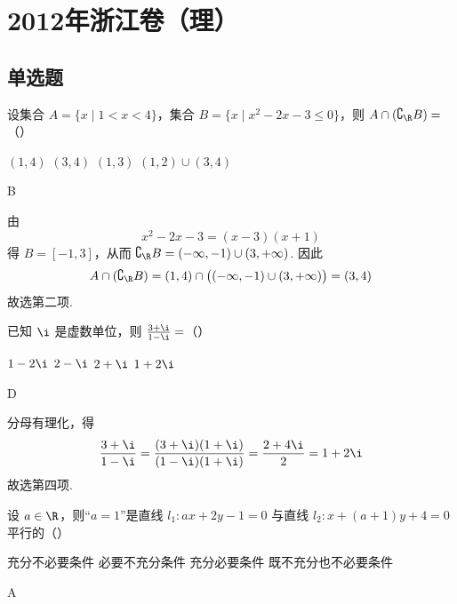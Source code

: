 \chapter{2012年浙江卷（理）}

\section{单选题}

\begin{problem}
设集合 \(A = \{x \mid 1 < x < 4\}\)，集合 \(B = \{x \mid x^2 - 2x - 3 \leqslant 0\}\)，则 \(A \cap (\complement_{\R} B) =\)（\quad）

\choices
    {\((1, 4)\)}
    {\((3, 4)\)}
    {\((1, 3)\)}
    {\((1,2)\cup(3,4)\)}
\end{problem}

\begin{answer}
B
\end{answer}

\begin{solution}
由
\[
x^2-2x-3=(x-3)(x+1)
\]
得 \(B=[-1,3]\)，从而
\(\complement_{\R}B=(-\infty,-1)\cup(3,+\infty)\).
因此
\[
A\cap(\complement_{\R}B)=(1,4)\cap\bigl((-\infty,-1)\cup(3,+\infty)\bigr)=(3,4)
\]
故选第二项.
\end{solution}

\begin{problem}
已知 \(\i\) 是虚数单位，则 \( \frac{3+\i}{1-\i}= \)（\quad）

\choices
    {\(1-2\i\)}
    {\(2-\i\)}
    {\(2 + \i\)}
    {\(1 + 2\i\)}
\end{problem}

\begin{answer}
D
\end{answer}

\begin{solution}
分母有理化，得
\[
\frac{3+\i}{1-\i}=\frac{(3+\i)(1+\i)}{(1-\i)(1+\i)}
=\frac{2+4\i}{2}=1+2\i
\]
故选第四项.
\end{solution}

\begin{problem}
设 \(a \in \R\)，则“\(a = 1\)”是直线 \(l_1: ax + 2y - 1 = 0\) 与直线 \(l_2: x + (a + 1)y + 4 = 0\) 平行的（\quad）

\choices
    {充分不必要条件}
    {必要不充分条件}
    {充分必要条件}
    {既不充分也不必要条件}
\end{problem}

\begin{answer}
A
\end{answer}

